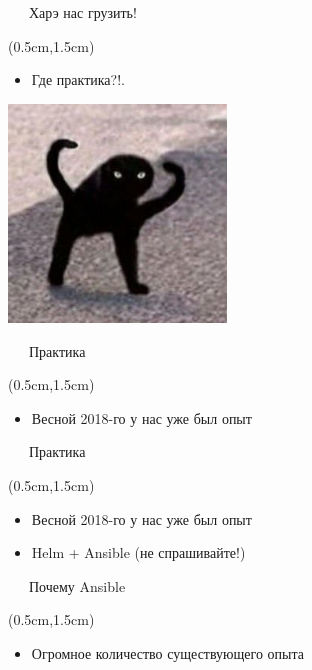 \documentclass[xetex,18pt,aspectratio=43]{beamer}
\begin{document}
\begin{Large}
\begin{frame}{\ \ \ Харэ нас грузить!}
\begin{textblock*}{\framewidth-0.8cm}(0.5cm,1.5cm)
\begin{itemize}
  \item Где практика?!.
\end{itemize}
\begin{minipage}{\textwidth}
  \centering
  \includegraphics[height=5.8cm]{img/sooqah}
\end{minipage}
\end{textblock*}
\end{frame}

\begin{frame}{\ \ \ Практика}
\begin{textblock*}{\framewidth-0.8cm}(0.5cm,1.5cm)
\begin{itemize}
  \item Весной 2018-го у нас уже был опыт
\end{itemize}
\end{textblock*}
\end{frame}

\begin{frame}{\ \ \ Практика}
\begin{textblock*}{\framewidth-0.8cm}(0.5cm,1.5cm)
\begin{itemize}
  \item Весной 2018-го у нас уже был опыт
  \item Helm + Ansible (не спрашивайте!)
\end{itemize}
\end{textblock*}
\end{frame}

\begin{frame}{\ \ \ Почему Ansible}
\begin{textblock*}{\framewidth-0.8cm}(0.5cm,1.5cm)
\begin{itemize}
  \item Огромное количество существующего опыта
\end{itemize}
\end{textblock*}
\end{frame}


\end{Large}
\end{document}
